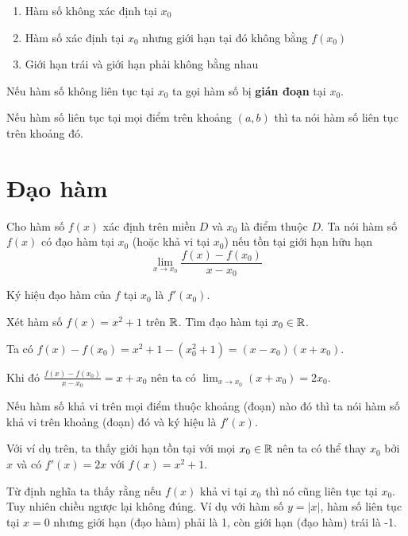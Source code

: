 \begin{enumerate}[noitemsep]
    \item Hàm số không xác định tại $x_0$
    \item Hàm số xác định tại $x_0$ nhưng giới hạn tại đó không bằng $f(x_0)$
    \item Giới hạn trái và giới hạn phải không bằng nhau
\end{enumerate}

Nếu hàm số không liên tục tại $x_0$ ta gọi hàm số bị \textbf{gián đoạn} tại $x_0$.

Nếu hàm số liên tục tại mọi điểm trên khoảng $(a, b)$ thì ta nói hàm số liên tục trên khoảng đó.

\section{Đạo hàm}

\begin{definition}
    Cho hàm số $f(x)$ xác định trên miền $D$ và $x_0$ là điểm thuộc $D$. Ta nói hàm số $f(x)$ có đạo hàm tại $x_0$ (hoặc khả vi tại $x_0$) nếu tồn tại giới hạn hữu hạn
    \[\lim_{x \to x_0}\frac{f(x) - f(x_0)}{x - x_0}\]

    Ký hiệu đạo hàm của $f$ tại $x_0$ là $f'(x_0)$.
\end{definition}

\begin{example}
    Xét hàm số $f(x) = x^2 + 1$ trên $\mathbb{R}$. Tìm đạo hàm tại $x_0 \in \mathbb{R}$.

    Ta có $f(x)-f(x_0) = x^2 + 1 - (x_0^2 + 1) = (x - x_0) (x + x_0)$.

    Khi đó $\frac{f(x)-f(x_0)}{x-x_0} = x + x_0$ nên ta có $\displaystyle{\lim_{x \to x_0} (x + x_0) = 2 x_0}$.
\end{example}

Nếu hàm số khả vi trên mọi điểm thuộc khoảng (đoạn) nào đó thì ta nói hàm số khả vi trên khoảng (đoạn) đó và ký hiệu là $f'(x)$.

Với ví dụ trên, ta thấy giới hạn tồn tại với mọi $x_0 \in \mathbb{R}$ nên ta có thể thay $x_0$ bởi $x$ và có $f'(x) = 2x$ với $f(x) = x^2 + 1$.

\begin{remark}
    Từ định nghĩa ta thấy rằng nếu $f(x)$ khả vi tại $x_0$ thì nó cũng liên tục tại $x_0$. Tuy nhiên chiều ngược lại không đúng. Ví dụ với hàm số $y = \lvert x \rvert$, hàm số liên tục tại $x=0$ nhưng giới hạn (đạo hàm) phải là 1, còn giới hạn (đạo hàm) trái là -1.
\end{remark}

